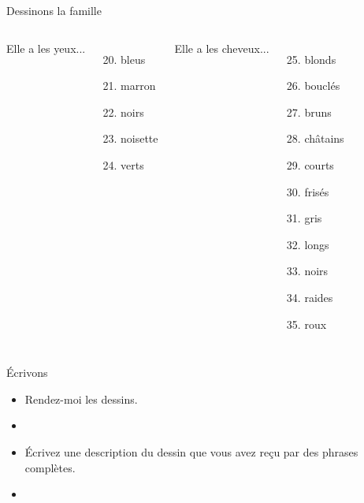 \begin{frame}{Dessinons la famille}
\begin{columns}
      Elle a les yeux...
      \begin{enumerate}
        \setcounter{enumi}{19}
        \item bleus
        \item marron
        \item noirs
        \item noisette
        \item verts
      \end{enumerate}
      Elle a les cheveux...
      \begin{enumerate}
        \setcounter{enumi}{24}
        \item blonds
        \item bouclés
        \item bruns
        \item châtains
        \item courts
        \item frisés
        \item gris
        \item longs
        \item noirs
        \item raides
        \item roux
      \end{enumerate}
  \end{columns}
\end{frame}

\begin{frame}{Écrivons}
  \begin{itemize}
    \item Rendez-moi les dessins.
    \item[] 
    \item<2-> Écrivez une description du dessin que vous avez reçu par des phrases complètes.
    \item<2->[] 
  \end{itemize}
\end{frame}